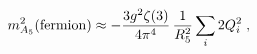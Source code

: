 \begin{equation}
m_{A_5}^2 ({\rm fermion}) \approx -\frac{3 g^2 \zeta(3)}{4\pi^4}\,
\frac{1}{R_5^2} \sum_i 2 Q_i^2 \;,
\end{equation}

